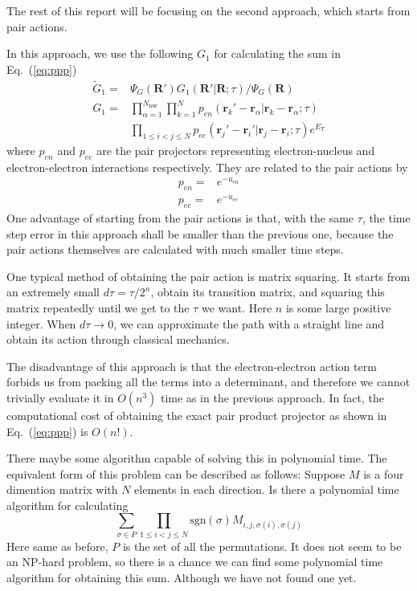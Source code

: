 \documentclass[aps,prl,reprint,groupedaddress]{revtex4-1}
\begin{document}
The rest of this report will be focusing on the second approach, which starts from pair actions.

In this approach, we use the following $G_1$ for calculating the sum in Eq.~(\ref{eq:ppp})
\begin{align}
\label{eq:G1ppp}
\widetilde{G}_1 = & \Psi_G(\bm{R'})G_1(\bm{R'}|\bm{R};\tau)/\Psi_G(\bm{R})\\
G_1 = &
\prod\limits_{\alpha = 1}^{N_{\mathrm{nuc}}}\prod\limits_{k=1}^{N}
p_{en}(\bm{r}_k'-\bm{r}_\alpha|\bm{r}_k-\bm{r}_\alpha;\tau)\nonumber\\
 & \prod\limits_{1\leq i < j \leq N}p_{ee}(\bm{r}_j'-\bm{r}_i'|\bm{r}_j-\bm{r}_i;\tau)
e^{E_T}
\end{align}
where $p_{en}$ and $p_{ee}$ are the pair projectors representing electron-nucleus and electron-electron interactions respectively.
They are related to the pair actions by
\begin{align}
p_{en} = & e^{-u_{en}}\\
p_{ee} = & e^{-u_{ee}}
\end{align}
One advantage of starting from the pair actions is that, with the same $\tau$, the time step error in this approach shall be smaller than the previous one, because the pair actions themselves are calculated with much smaller time steps.

One typical method of obtaining the pair action is matrix squaring.
It starts from an extremely small $d\tau = \tau/2^n$, obtain its transition matrix, and squaring this matrix repeatedly until we get to the $\tau$ we want.
Here $n$ is some large positive integer.
When $d\tau \to 0$, we can approximate the path with a straight line and obtain its action through classical mechanics.

The disadvantage of this approach is that the electron-electron action term forbids us from packing all the terms into a determinant, and therefore we cannot trivially evaluate it in $O(n^3)$ time as in the previous approach.
In fact, the computational cost of obtaining the exact pair product projector as shown in Eq.~(\ref{eq:ppp}) is $O(n!)$.

There maybe some algorithm capable of solving this in polynomial time.
The equivalent form of this problem can be described as follows:
Suppose $M$ is a four dimention matrix with $N$ elements in each direction.
Is there a polynomial time algorithm for calculating
\begin{equation}
\label{eq:algo}
\sum\limits_{\sigma \in P}\prod\limits_{1\leq i < j \leq N}\mathrm{sgn}(\sigma)M_{i,j,\sigma(i),\sigma(j)}
\end{equation}
Here same as before, $P$ is the set of all the permutations.
It does not seem to be an NP-hard problem, so there is a chance we can find some polynomial time algorithm for obtaining this sum.
Although we have not found one yet.
\end{document}

